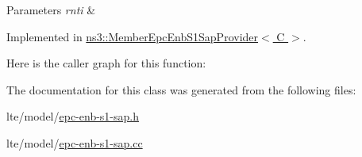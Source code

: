 \begin{DoxyParams}{Parameters}
{\em rnti} & \\
\hline
\end{DoxyParams}


Implemented in \hyperlink{classns3_1_1MemberEpcEnbS1SapProvider_a37e4302945cdca21a9ec7bda2e3b60cc}{ns3\+::\+Member\+Epc\+Enb\+S1\+Sap\+Provider$<$ C $>$}.



Here is the caller graph for this function\+:




The documentation for this class was generated from the following files\+:\begin{DoxyCompactItemize}
\item 
lte/model/\hyperlink{epc-enb-s1-sap_8h}{epc-\/enb-\/s1-\/sap.\+h}\item 
lte/model/\hyperlink{epc-enb-s1-sap_8cc}{epc-\/enb-\/s1-\/sap.\+cc}\end{DoxyCompactItemize}
